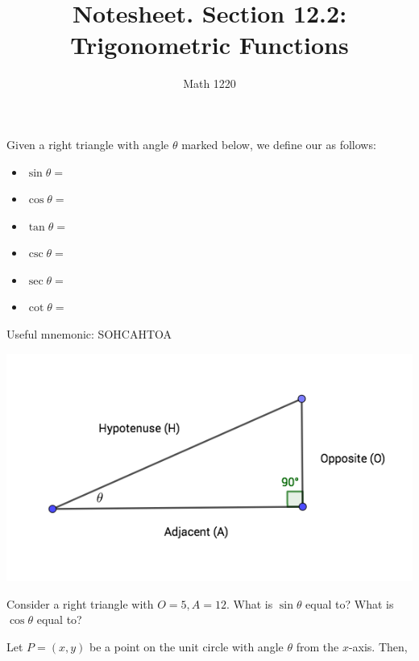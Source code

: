 \documentclass[12pt, a4paper]{article}
\author{Math 1220}
\title{Notesheet. Section 12.2: Trigonometric Functions}
\date{}
\begin{document}
\maketitle
\nameline
\begin{defi}
  Given a right triangle with angle \(\theta\) marked below, we define
  our  as follows:\\
  \begin{minipage}{0.5\linewidth}
    \begin{itemize}
    \item \(\sin \theta =\)
    \item \(\cos \theta =\)
    \item \(\tan \theta =\)
    \item \(\csc \theta =\)
    \item \(\sec \theta =\)
    \item \(\cot \theta =\)
    \end{itemize}
    Useful mnemonic: SOHCAHTOA
  \end{minipage}
  \begin{minipage}{0.5\linewidth}
  \includegraphics[scale=0.5]{images/right-triangle}    
  \end{minipage}
\end{defi}
\vspace{-0.3in}
\begin{ex}
  Consider a right triangle with \(O = 5, A = 12\). What is \(\sin
  \theta\) equal to? What is \(\cos \theta\) equal to?
\end{ex}
\vspace{-0.5in}
\hspace{-0.25in}\begin{minipage}{0.8\linewidth}
\begin{thrm}
  Let \(P=(x,y)\) be a point on the unit circle with angle \(\theta\)
  from the \(x\)-axis. Then, \\
\end{thrm}  
\end{minipage}
\end{document}
